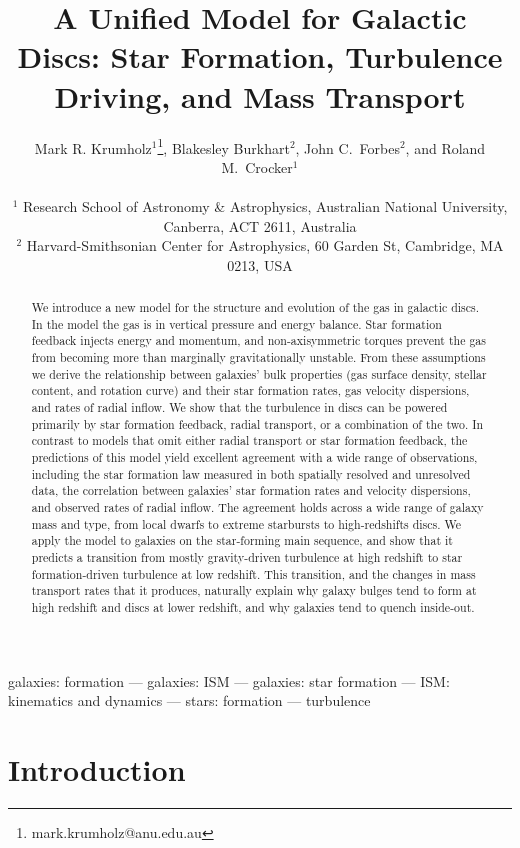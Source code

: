 \documentclass[useAMS,usenatbib]{mn2e}
\title[Galactic Discs]{A Unified Model for Galactic Discs: Star Formation, Turbulence Driving, and Mass Transport}
\author[Krumholz et al.]{Mark R. Krumholz$^1$\thanks{mark.krumholz@anu.edu.au},
Blakesley Burkhart$^2$,
John C.~Forbes$^2$, and Roland M.~Crocker$^1$
\\ \\
$^1$ Research School of Astronomy \& Astrophysics, Australian National University, Canberra, ACT 2611, Australia\\
$^2$ Harvard-Smithsonian Center for Astrophysics, 60 Garden St, Cambridge, MA 0213, USA
}
\begin{document}
\maketitle
\label{firstpage}
\begin{abstract}
We introduce a new model for the structure and evolution of the gas in galactic discs. In the model the gas is in vertical pressure and energy balance. Star formation feedback injects energy and momentum, and non-axisymmetric torques prevent the gas from becoming more than marginally gravitationally unstable. From these assumptions we derive the relationship between galaxies' bulk properties (gas surface density, stellar content, and rotation curve) and their star formation rates, gas velocity dispersions, and rates of radial inflow. We show that the turbulence in discs can be powered primarily by star formation feedback, radial transport, or a combination of the two. In contrast to models that omit either radial transport or star formation feedback, the predictions of this model yield excellent agreement with a wide range of observations, including the star formation law measured in both spatially resolved and unresolved data, the correlation between galaxies' star formation rates and velocity dispersions, and observed rates of radial inflow. The agreement holds across a wide range of galaxy mass and type, from local dwarfs to extreme starbursts to high-redshifts discs. We apply the model to galaxies on the star-forming main sequence, and show that it predicts a transition from mostly gravity-driven turbulence at high redshift to star formation-driven turbulence at low redshift. This transition, and the changes in mass transport rates that it produces, naturally explain why galaxy bulges tend to form at high redshift and discs at lower redshift, and why galaxies tend to quench inside-out.
\end{abstract}


\begin{keywords}
galaxies: formation --- galaxies: ISM --- galaxies: star formation --- ISM: kinematics and dynamics --- stars: formation --- turbulence 
\vspace{0.5in}
\end{keywords}


\section{Introduction}
\label{sec:intro}
\end{document}
